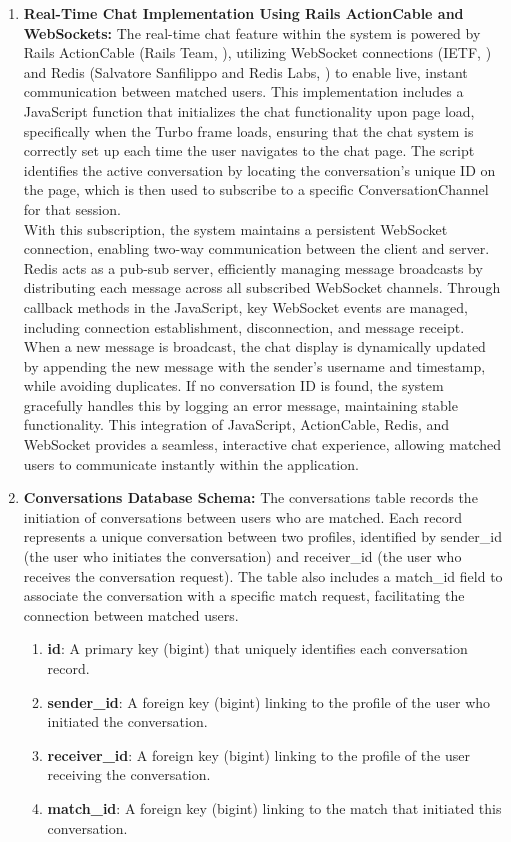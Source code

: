 \begin{enumerate}
    \newpage
    \item \textbf{Real-Time Chat Implementation Using Rails ActionCable and WebSockets:}
    The real-time chat feature within the system is powered by Rails ActionCable (Rails Team, \citeyear{actioncable2024}), utilizing WebSocket connections (IETF, \citeyear{websocket2024}) and Redis (Salvatore Sanfilippo and Redis Labs, \citeyear{redis2024}) to enable live, instant communication between matched users. This implementation includes a JavaScript function that initializes the chat functionality upon page load, specifically when the Turbo frame loads, ensuring that the chat system is correctly set up each time the user navigates to the chat page. The script identifies the active conversation by locating the conversation's unique ID on the page, which is then used to subscribe to a specific ConversationChannel for that session.\\


    With this subscription, the system maintains a persistent WebSocket connection, enabling two-way communication between the client and server. Redis acts as a pub-sub server, efficiently managing message broadcasts by distributing each message across all subscribed WebSocket channels. Through callback methods in the JavaScript, key WebSocket events are managed, including connection establishment, disconnection, and message receipt. When a new message is broadcast, the chat display is dynamically updated by appending the new message with the sender’s username and timestamp, while avoiding duplicates. If no conversation ID is found, the system gracefully handles this by logging an error message, maintaining stable functionality. This integration of JavaScript, ActionCable, Redis, and WebSocket provides a seamless, interactive chat experience, allowing matched users to communicate instantly within the application.

    \newpage
    \item \textbf{Conversations Database Schema:}
    The conversations table records the initiation of conversations between users who are matched. Each record represents a unique conversation between two profiles, identified by sender\_id (the user who initiates the conversation) and receiver\_id (the user who receives the conversation request). The table also includes a match\_id field to associate the conversation with a specific match request, facilitating the connection between matched users.

    \begin{enumerate}
    \item \textbf{id}: A primary key (bigint) that uniquely identifies each conversation record.
    \item \textbf{sender\_id}: A foreign key (bigint) linking to the profile of the user who initiated the conversation.
    \item \textbf{receiver\_id}: A foreign key (bigint) linking to the profile of the user receiving the conversation.
    \item \textbf{match\_id}: A foreign key (bigint) linking to the match that initiated this conversation.
    \end{enumerate}
    

\end{enumerate}
